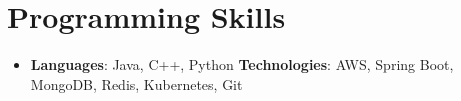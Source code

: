 \documentclass[letterpaper,11pt]{article}
\newcommand{\resumeItem}[1]{
    \item\small{
        {#1 \vspace{-2pt}}
    }
}
\newcommand{\resumeSubHeadingListStart}{\begin{itemize}[leftmargin=*]}
\newcommand{\resumeSubHeadingListEnd}{\end{itemize}}
\newcommand{\resumeItemListStart}{\begin{itemize}}
\begin{document}




\section{Programming Skills}
 \resumeSubHeadingListStart
   \item{
     \textbf{Languages}{: Java, C++, Python}
     \hfill
     \textbf{Technologies}{: AWS, Spring Boot, MongoDB, Redis, Kubernetes, Git}
   }
 \resumeSubHeadingListEnd


\end{document}
